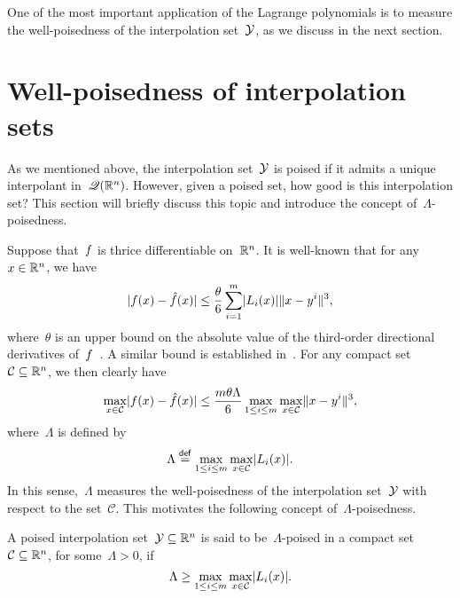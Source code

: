 One of the most important application of the Lagrange polynomials is to measure the well-poisedness of the interpolation set~$\xpt$, as we discuss in the next section.

\section{Well-poisedness of interpolation sets}
\label{sec:poisedness}

As we mentioned above, the interpolation set~$\xpt$ is poised if it admits a unique interpolant in~$\mathscr{Q}(\mathbb{R}^n)$.
However, given a poised set, how good is this interpolation set?
This section will briefly discuss this topic and introduce the concept of~$\Lambda$-poisedness.

Suppose that~$f$ is thrice differentiable on~$\mathbb{R}^n$.
It is well-known that for any~$x \in \mathbb{R}^n$, we have
\begin{equation}
    \label{eq:Ciarlet_Raviart_0}
    \abs{\obj(x) - \objm(x)} \le \frac{\theta}{6} \sum_{i = 1}^m \abs{\lagp[i](x)} \norm{x - y^i}^3,
\end{equation}
where~$\theta$ is an upper bound on the absolute value of the third-order directional derivatives of~$f$~\cite[thm.~2]{Powell_2001}.
A similar bound is established in~\cite[thm.~2]{Ciarlet_Raviart_1972}.
For any compact set~$\mathcal{C} \subseteq \mathbb{R}^n$, we then clearly have
\begin{equation}
    \label{eq:ciarlet-raviard-bound}
    \max_{x \in \mathcal{C}} \abs{\obj(x) - \objm(x)} \le \frac{m \theta \Lambda}{6} \max_{1 \le i \le m} \max_{x \in \mathcal{C}} \norm{x - y^i}^3,
\end{equation}
where~$\Lambda$ is defined by
\begin{equation}
    \label{eq:lambda-poisedness-convex-hull}
    \Lambda \eqdef \max_{1 \le i \le m} \max_{x \in \mathcal{C}} \abs{\lagp[i](x)}.
\end{equation}
In this sense,~$\Lambda$ measures the well-poisedness of the interpolation set~$\xpt$ with respect to the set~$\mathcal{C}$.
This motivates the following concept of~$\Lambda$-poisedness.

\begin{definition}
    \label{def:lambda-poisedness}
    A poised interpolation set~$\xpt \subseteq \R^n$ is said to be~$\Lambda$-poised in a compact set~$\mathcal{C} \subseteq \mathbb{R}^n$, for some~$\Lambda > 0$, if
    \begin{equation*}
        \Lambda \ge \max_{1 \le i \le m} \max_{x \in \mathcal{C}} \abs{\lagp[i](x)}.
    \end{equation*}
\end{definition}

